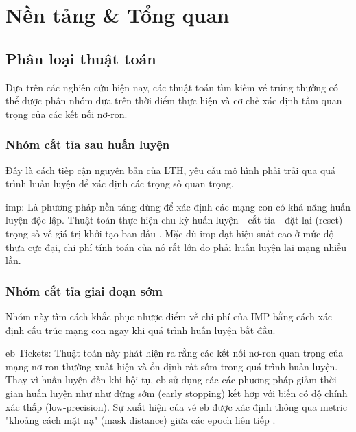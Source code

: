 \chapter{Nền tảng \& Tổng quan}

    \section{Phân loại thuật toán}
        Dựa trên các nghiên cứu hiện nay, các thuật toán tìm kiếm vé trúng thưởng có thể được phân nhóm dựa trên thời điểm thực hiện \pruning và cơ chế xác định tầm quan trọng của các kết nối nơ-ron.

        \subsection{Nhóm cắt tỉa sau huấn luyện}
            Đây là cách tiếp cận nguyên bản của LTH, yêu cầu mô hình phải trải qua quá trình huấn luyện để xác định các trọng số quan trọng.

            \gls{imp}: Là phương pháp nền tảng dùng để xác định các mạng con có khả năng huấn luyện độc lập. Thuật toán thực hiện chu kỳ huấn luyện - cắt tỉa - đặt lại (reset) trọng số về giá trị khởi tạo ban đầu \cite{imp}. Mặc dù \gls{imp} đạt hiệu suất cao ở mức độ thưa cực đại, chi phí tính toán của nó rất lớn do phải huấn luyện lại mạng nhiều lần.

        \subsection{Nhóm cắt tỉa giai đoạn sớm}
            Nhóm này tìm cách khắc phục nhược điểm về chi phí của IMP bằng cách xác định cấu trúc mạng con ngay khi quá trình huấn luyện bắt đầu.

            \gls{eb} Tickets: Thuật toán này phát hiện ra rằng các kết nối nơ-ron quan trọng của mạng nơ-ron thường xuất hiện và ổn định rất sớm trong quá trình huấn luyện. Thay vì huấn luyện đến khi hội tụ, \gls{eb} sử dụng các các phương pháp giảm thời gian huấn luyện như như dừng sớm (early stopping) kết hợp với biến có độ chính xác thấp (low-precision). Sự xuất hiện của vé \gls{eb} được xác định thông qua metric "khoảng cách mặt nạ" (mask distance) giữa các epoch liên tiếp \cite{earlybird}.

